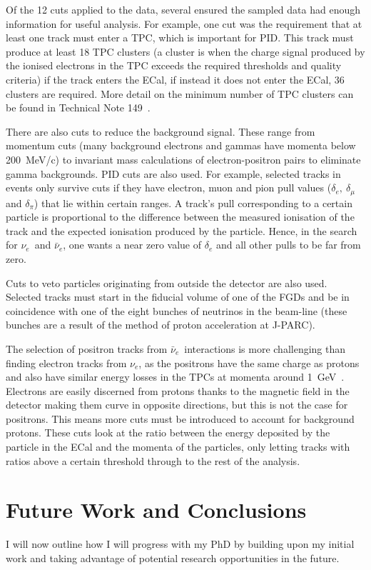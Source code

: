 \documentclass[aps,pra,12pt,notitlepage,tightenlines]{revtex4-1}
\newcommand{\nue}{$\nu_e$}
\newcommand{\anue}{$\bar\nu_e$}
\begin{document}
Of the 12 cuts applied to the data, several ensured the sampled data had enough information for useful analysis. For example, one cut was the requirement that at least one track must enter a TPC, which is important for PID. This track must produce at least 18 TPC clusters (a cluster is when the charge signal produced by the ionised electrons in the TPC exceeds the required thresholds and quality criteria) if the track enters the ECal, if instead it does not enter the ECal, 36 clusters are required. More detail on the minimum number of TPC clusters can be found in Technical Note 149~\cite{Giganti2013}.

There are also cuts to reduce the background signal. These range from momentum cuts (many background electrons and gammas have momenta below 200~MeV/c) to invariant mass calculations of electron-positron pairs to eliminate gamma backgrounds. PID cuts are also used. For example, selected tracks in events only survive cuts if they have electron, muon and pion pull values ($\delta_e, \ \delta_\mu$ and $\delta_\pi$) that lie within certain ranges. A track's pull corresponding to a certain particle is proportional to the difference between the measured ionisation of the track and the expected ionisation produced by the particle. Hence, in the search for \nue \ and \anue, one wants a near zero value of $\delta_e$ and all other pulls to be far from zero.

Cuts to veto particles originating from outside the detector are also used. Selected tracks must start in the fiducial volume of one of the FGDs and be in coincidence with one of the eight bunches of neutrinos in the beam-line (these bunches are a result of the method of proton acceleration at J-PARC).

The selection of positron tracks from \anue \ interactions is more challenging than finding electron tracks from \nue, as the positrons have the same charge as protons and also have similar energy losses in the TPCs at momenta around 1~GeV~\cite{Giganti2013}. Electrons are easily discerned from protons thanks to the magnetic field in the detector making them curve in opposite directions, but this is not the case for positrons. This means more cuts must be introduced to account for background protons. These cuts look at the ratio between the energy deposited by the particle in the ECal and the momenta of the particles, only letting tracks with ratios above a certain threshold through to the rest of the analysis.

\section{Future Work and Conclusions}
I will now outline how I will progress with my PhD by building upon my initial work and taking advantage of potential research opportunities in the future.
\end{document}
